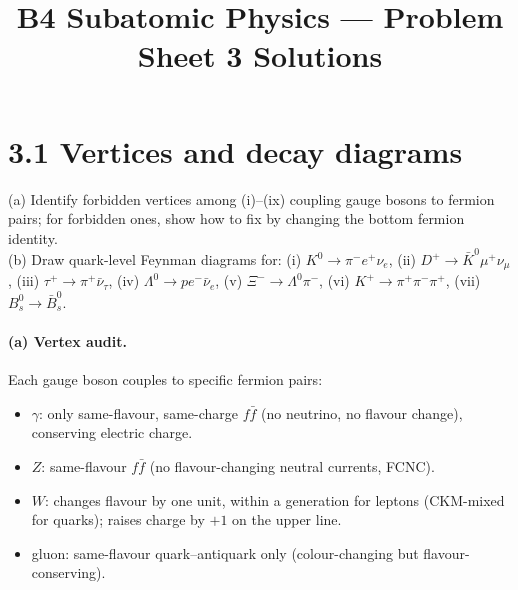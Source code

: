 \documentclass[11pt]{article}
\title{B4 Subatomic Physics --- Problem Sheet 3 Solutions}
\author{}
\date{}
\newcommand{\Q}[1]{\begin{question}#1\end{question}}
\begin{document}
\maketitle

\section*{3.1 \quad Vertices and decay diagrams}

\Q{(a) Identify forbidden vertices among (i)--(ix) coupling gauge bosons to fermion pairs; for forbidden ones, show how to fix by changing the bottom fermion identity.\\
(b) Draw quark-level Feynman diagrams for: (i) $K^0\to\pi^- e^+\nu_e$, (ii) $D^+\to\bar K^0\mu^+\nu_\mu$, (iii) $\tau^+\to\pi^+\bar\nu_\tau$, (iv) $\Lambda^0\to p e^-\bar\nu_e$, (v) $\Xi^-\to\Lambda^0\pi^-$, (vi) $K^+\to\pi^+\pi^-\pi^+$, (vii) $B^0_s\to\bar B^0_s$.}

\paragraph{(a) Vertex audit.} Each gauge boson couples to specific fermion pairs:
\begin{itemize}[itemsep=1pt]
\item $\gamma$: only same-flavour, same-charge $f\bar f$ (no neutrino, no flavour change), conserving electric charge.
\item $Z$: same-flavour $f\bar f$ (no flavour-changing neutral currents, FCNC).
\item $W$: changes flavour by one unit, within a generation for leptons (CKM-mixed for quarks); raises charge by $+1$ on the upper line.
\item gluon: same-flavour quark--antiquark only (colour-changing but flavour-conserving).
\end{itemize}
\end{document}
